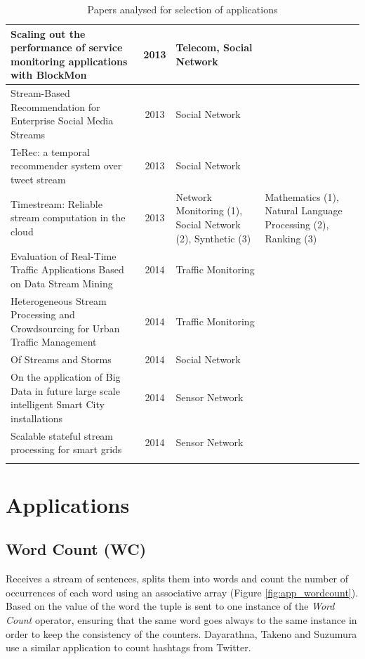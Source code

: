 \documentclass[ppgc,diss,english]{iiufrgs}
\begin{document}
\begin{center}
\begin{longtable}{ | p{8cm} | c | p{3cm} | p{2.5cm} |}
		Scaling out the performance of service monitoring applications with BlockMon \cite{simoncelli2013scaling} & 2013 & Telecom, Social Network & \\\hline
		Stream-Based Recommendation for Enterprise Social Media Streams \cite{lunze2013stream} & 2013 & Social Network & \\\hline
		TeRec: a temporal recommender system over tweet stream \cite{chen2013terec} & 2013 & Social Network & \\\hline
		Timestream: Reliable stream computation in the cloud \cite{qian2013timestream} & 2013 & Network Monitoring (1), Social Network (2), Synthetic (3) & Mathematics (1), Natural Language Processing (2), Ranking (3) \\\hline
		Evaluation of Real-Time Traffic Applications Based on Data Stream Mining \cite{geisler2014evaluation} & 2014 & Traffic Monitoring & \\\hline
		Heterogeneous Stream Processing and Crowdsourcing for Urban Traffic Management \cite{artikis2014heterogeneous} & 2014 & Traffic Monitoring & \\\hline
		Of Streams and Storms \cite{nabi2014streams} & 2014 & Social Network & \\\hline
		On the application of Big Data in future large scale intelligent Smart City installations \cite{girtelschmid2014application} & 2014 & Sensor Network & \\\hline
		Scalable stateful stream processing for smart grids \cite{fernandez2014scalable} & 2014 & Sensor Network & \\\hline
	
	\caption{Papers analysed for selection of applications}
	\label{table:papers_analysis}
	\end{longtable}
\end{center}



\section{Applications}
\label{sec:applications}

\subsection{Word Count (WC)}

Receives a stream of sentences, splits them into words and count the number of occurrences of each word using an associative array (Figure \ref{fig:app_wordcount}). Based on the value of the word the tuple is sent to one instance of the \emph{Word Count} operator, ensuring that the same word goes always to the same instance in order to keep the consistency of the counters. Dayarathna, Takeno and Suzumura \cite{dayarathna2011performance} use a similar application to count hashtags from Twitter.
\end{document}

